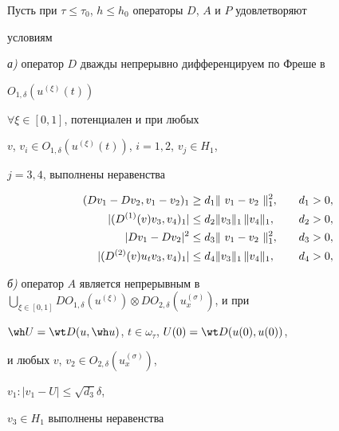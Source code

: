 \begin{thmnonum}


\label{t1}


Пусть при $\tau\le \tau_0$, $h\le h_0$ операторы $D$, $A$ и $P$ удовлетворяют


условиям





{\em а)} оператор $D$ дважды непрерывно дифференцируем по Фреше в


$O_{1,\delta}\left(u^{(\xi)}(t)\right)$


$\forall \xi \in [0,1]$, потенциален и при любых


$v$, $v_i \in O_{1,\delta}\left(u^{(\xi)}(t)\right)$, $i=1,2$, $v_j \in H_1$,


$j=3,4$, выполнены неравенства


\begin{alignat}{2}


(Dv_1- Dv_2, v_1- v_2)_1 &\ge  d_{1}\|~v_{1}- v_{2}~\|_1^{2},


&\quad  d_{1} &> 0,\label{3}\\


|(D^{(1)}(v)v_{3},v_{4})_1|&\le d_{2}\|v_{3}\|_1\, \|v_{4}\|_1,


&\quad d_{2}&>0,\label{4}\\


| Dv_{1}- Dv_{2}| ^{2} &\le  d_{3}\|~v_{1}-v_{2}~\|_1^2, &\quad d_{3}&>0,


\notag\\


|(D^{(2)}(v)u_{t}v_3, v_4)_1|&\le d_{4}\|v_{3}\|_1 \, \|v_{4}\|_1, 


&\quad d_{4} &> 0,


\label{5}


\end{alignat}





{\em б)} оператор $A$ является непрерывным в $\bigcup \limits_{\xi \in [0,1]}


DO_{1,\delta}(u^{(\xi)})\otimes DO_{2,\delta}(u_x^{(\sigma)})$, и при


$\wh U=\wt D(u,\wh u)$, $t \in \omega_\tau$, $U(0)=\wt D(u(0),u(0))$,


и любых $v$, $v_2 \in O_{2,\delta}(u_x^{(\sigma)})$,


$v_1:|v_1-U|\leq \sqrt{d_3} \delta$,


$v_3 \in H_1$ выполнены неравенства



\end{thmnonum}
